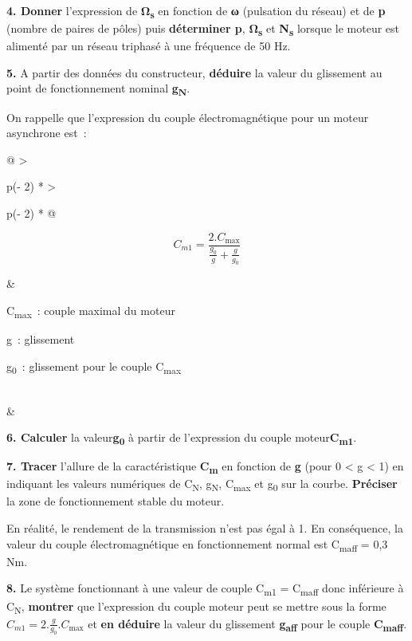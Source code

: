 \textbf{4. Donner} l'expression de \textbf{Ω\textsubscript{s}} en fonction de \textbf{ω} (pulsation du réseau) et de \textbf{p} (nombre de paires de pôles) puis \textbf{déterminer p}, \textbf{Ω\textsubscript{s}} et \textbf{N\textsubscript{s}} lorsque le moteur est alimenté par un réseau triphasé à une fréquence de 50 Hz.

\textbf{5.} A partir des données du constructeur, \textbf{déduire} la valeur du glissement au point de fonctionnement nominal \textbf{g\textsubscript{N}}.

On rappelle que l'expression du couple électromagnétique pour un moteur asynchrone est~:

\begin{longtable}[]{@{}
  >{\raggedright\arraybackslash}p{(\columnwidth - 2\tabcolsep) * }
  >{\raggedright\arraybackslash}p{(\columnwidth - 2\tabcolsep) * }@{}}
\toprule\noalign{}
\begin{minipage}[b]{\linewidth}\raggedright
\[C_{m1} =
\frac{2.C_{\max}}{\frac{g_{
0}}{g} + \frac{g}{g_{0}}}\]
\end{minipage} & \begin{minipage}[b]{\linewidth}\raggedright
C\textsubscript{max}~: couple maximal du moteur

g~: glissement

g\textsubscript{0}~: glissement pour le couple C\textsubscript{max}
\end{minipage} \\
\midrule\noalign{}
\endhead
\bottomrule\noalign{}
\endlastfoot
& \\
\end{longtable}

\textbf{6. Calculer} la valeur\textbf{g\textsubscript{0}} à partir de l'expression du couple moteur\textbf{C\textsubscript{m1}}.

\textbf{7. Tracer} l'allure de la caractéristique \textbf{C\textsubscript{m}} en fonction de \textbf{g} (pour 0 \textless{} g \textless{} 1) en indiquant les valeurs numériques de C\textsubscript{N}, g\textsubscript{N}, C\textsubscript{max} et g\textsubscript{0} sur la courbe. \textbf{Préciser} la zone de fonctionnement stable du moteur.

En réalité, le rendement de la transmission n'est pas égal à 1. En conséquence, la valeur du couple électromagnétique en fonctionnement normal est C\textsubscript{maff} = 0,3 Nm.

\textbf{8.} Le système fonctionnant à une valeur de couple C\textsubscript{m1} = C\textsubscript{maff} donc inférieure à C\textsubscript{N}, \textbf{montrer} que l'expression du couple moteur peut se mettre sous la forme\(C_{m1} = 2.\frac{g}{g_{0}}.C_{\max}\) et \textbf{en déduire} la valeur du glissement \textbf{g\textsubscript{aff}} pour le couple \textbf{C\textsubscript{maff}}.

